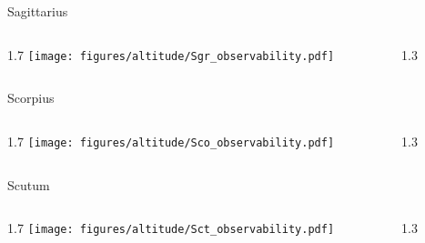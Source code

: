 \documentclass[final]{beamer}
\newlength{\colwidth}
\begin{document}
\begin{frame}[t]{}
    \Large{Sagittarius}
    \begin{columns}[T]
        \begin{column}{1.7\colwidth}
            \centering
            \texttt{[image: figures/altitude/Sgr\_observability.pdf]}
        \end{column}
        \begin{column}{1.3\colwidth}
            \Large
            
        \end{column}
    \end{columns}

    \Large{Scorpius}
    \begin{columns}[T]
        \begin{column}{1.7\colwidth}
            \centering
            \texttt{[image: figures/altitude/Sco\_observability.pdf]}
        \end{column}
        \begin{column}{1.3\colwidth}
            \Large
            
        \end{column}
    \end{columns}

    \Large{Scutum}
    \begin{columns}[T]
        \begin{column}{1.7\colwidth}
            \centering
            \texttt{[image: figures/altitude/Sct\_observability.pdf]}
        \end{column}
        \begin{column}{1.3\colwidth}
            \Large
            
        \end{column}
    \end{columns}
\end{frame}

\end{document}

